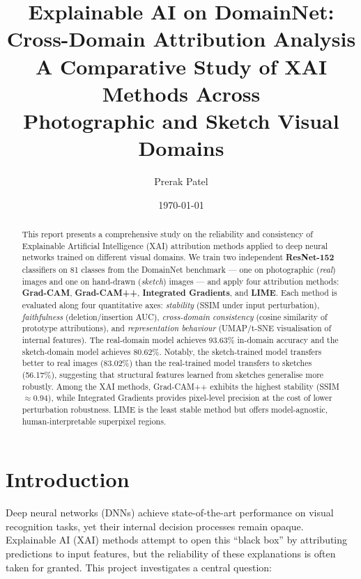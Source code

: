\documentclass[12pt, a4paper]{article}
\title{%
    \textbf{Explainable AI on DomainNet:\\
    Cross-Domain Attribution Analysis}\\[0.8em]
    \large A Comparative Study of XAI Methods Across \\
    Photographic and Sketch Visual Domains
}
\author{Prerak Patel}
\date{\today}
\begin{document}
\maketitle

\begin{abstract}
This report presents a comprehensive study on the reliability and consistency
of Explainable Artificial Intelligence (XAI) attribution methods applied to
deep neural networks trained on different visual domains.  We train two
independent \textbf{ResNet-152} classifiers on 81 classes from the DomainNet
benchmark --- one on photographic (\textit{real}) images and one on hand-drawn
(\textit{sketch}) images --- and apply four attribution methods: \textbf{Grad-CAM},
\textbf{Grad-CAM++}, \textbf{Integrated Gradients}, and \textbf{LIME}.
Each method is evaluated along four quantitative axes:
\emph{stability} (SSIM under input perturbation),
\emph{faithfulness} (deletion/insertion AUC),
\emph{cross-domain consistency} (cosine similarity of prototype attributions),
and \emph{representation behaviour} (UMAP/t-SNE visualisation of internal
features).  The real-domain model achieves 93.63\% in-domain accuracy and the
sketch-domain model achieves 80.62\%.  Notably, the sketch-trained model
transfers better to real images (83.02\%) than the real-trained model transfers
to sketches (56.17\%), suggesting that structural features learned from sketches
generalise more robustly.  Among the XAI methods, Grad-CAM++ exhibits the
highest stability (SSIM $\approx 0.94$), while Integrated Gradients provides
pixel-level precision at the cost of lower perturbation robustness.  LIME is
the least stable method but offers model-agnostic, human-interpretable
superpixel regions.
\end{abstract}

\tableofcontents
\newpage

\section{Introduction}
\label{sec:introduction}

Deep neural networks (DNNs) achieve state-of-the-art performance on visual
recognition tasks, yet their internal decision processes remain opaque.
Explainable AI (XAI) methods attempt to open this ``black box'' by attributing
predictions to input features, but the reliability of these explanations is
often taken for granted.  This project investigates a central question:
\end{document}
